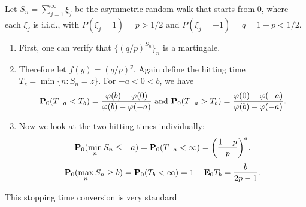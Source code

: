 \begin{thm}
    Let $S_n = \sum_{j=1}^\infty \xi_j$ be the asymmetric random walk that starts from $0$, where each $\xi_j$ is i.i.d., with $P(\xi_j =1) = p > 1/2$ and $P(\xi_j = -1) = q = 1 - p < 1/2$.

    \begin{enumerate}
        \item First, one can verify that $\bigl\{(q/p)^{S_n}\bigr\}_n$ is a martingale.
        \item Therefore let $f(y) = (q/p)^y$. Again define the hitting time $T_z = \min\{n : S_n = z\}$. For $- a < 0 < b$, we have\[
        \mathbf{P}_0 (T_{-a} < T_b) = \frac{\varphi(b) - \varphi(0)}{\varphi(b) - \varphi(-a)} \text{ and } \mathbf{P}_0 (T_{-a} > T_b) = \frac{\varphi(0) - \varphi(-a)}{\varphi(b) - \varphi(-a)}.
        \]
        \item Now we look at the two hitting times individually: \[\mathbf{P}_0(\min_n S_n \leq -a) = \mathbf{P}_0(T_{-a} < \infty) = \biggl(\frac{1 - p}{p}\biggr)^a.\]
        \[
        \mathbf{P}_0(\max_n S_n \geq b ) = \mathbf{P}_0(T_b < \infty) = 1 \quad \mathop{}\!\mathbf{E}_0 T_b = \frac{b}{2p-1}.
    \]
    \end{enumerate}
    This stopping time conversion is very standard
\end{thm}